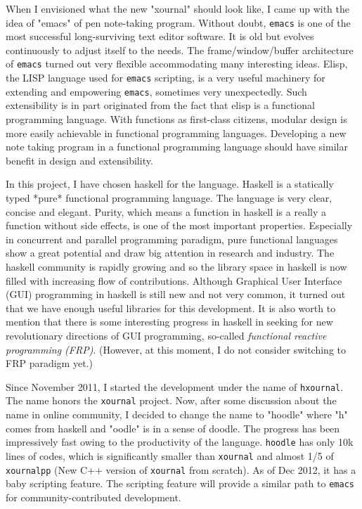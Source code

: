 \documentclass[11pt,fleqn]{book} %
\begin{document}
When I envisioned what the new "xournal" should look like, I came up with the idea of "emacs"
 of pen note-taking program. Without doubt, \verb|emacs| is one of the most
successful long-surviving text editor software. It is old but evolves continuously to adjust 
itself to the needs.
The frame/window/buffer architecture
of \verb|emacs| turned out very flexible accommodating many interesting 
ideas. Elisp, the LISP language used for \verb|emacs| scripting, is a very 
useful machinery for extending and empowering \verb|emacs|, sometimes very unexpectedly. 
Such extensibility is in part originated from the fact that 
elisp is a functional programming language. With functions as first-class
citizens, modular design is more easily achievable in functional 
programming languages. Developing a new note taking program in 
a functional programming language should have similar benefit in design and extensibility. 


In this project, I have chosen haskell for the language. Haskell is a statically typed *pure* 
functional programming language. The language is very clear, concise and elegant.
Purity, which means a function in haskell is a really a function without side effects, is 
one of the most important properties. Especially in concurrent and parallel programming paradigm, 
pure functional languages show a great potential and draw big attention in research and industry. 
The haskell community is rapidly growing and so the library space in haskell is now 
filled with increasing flow of contributions.  
Although Graphical User Interface (GUI) programming in haskell is still new and not 
very common, it turned out that we have enough useful libraries for this development.
It is also worth to mention that there is some interesting progress in haskell in seeking 
for new revolutionary directions of GUI programming, so-called {\em functional reactive programming (FRP)}. 
(However, at this moment, I do not consider switching to FRP paradigm yet.) 



Since November 2011, I started the development under the name of 
{\verb|hxournal|}. The name honors 
the \verb|xournal| project. Now, after some discussion about the name in 
online community, I decided to change the name to "hoodle" where "h" comes from haskell 
and "oodle" is in a sense of doodle. The progress has been impressively fast owing to 
the productivity of the language. \verb|hoodle| has only 10k lines of codes,
which is significantly smaller than \verb|xournal| and almost 1/5 of \verb|xournalpp|
(New C++ version of \verb|xournal| from scratch). As of Dec 2012, it has a baby 
scripting feature. The scripting feature will provide a similar path to \verb|emacs| 
for community-contributed development.  
\end{document}

